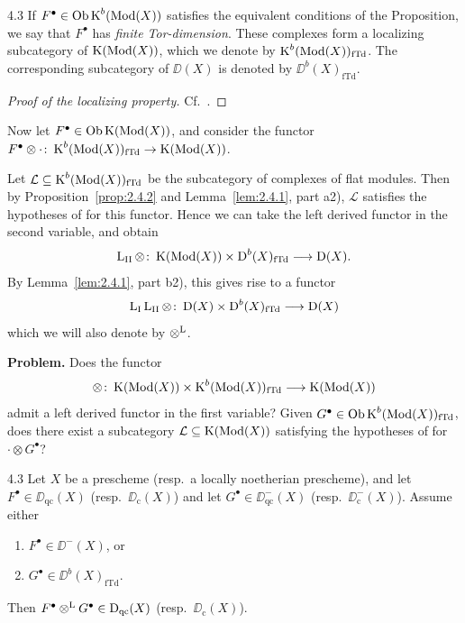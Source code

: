 \begin{bookdefinitioncorollary}{4.3}\label{defcor:2.4.3}
If $F^\bullet\in\operatorname{Ob}\operatorname{K}^b(\operatorname{Mod}(X))$ satisfies the equivalent conditions of the Proposition, we say that $F^\bullet$ has \emph{finite Tor-dimension}. These complexes form a localizing subcategory of $\operatorname{K}(\operatorname{Mod}(X))$, which we denote by $\operatorname{K}^b(\operatorname{Mod}(X))_{\mathrm{fTd}}$. The corresponding subcategory of $\DD(X)$ is denoted by $\DD^b(X)_{\mathrm{fTd}}$.
\end{bookdefinitioncorollary}

\begin{proof}[Proof of the localizing property]
Cf.\ .
\end{proof}

Now let $F^\bullet\in\operatorname{Ob}\operatorname{K}(\operatorname{Mod}(X))$, and consider the functor $F^\bullet\otimes\cdot\colon \operatorname{K}^b(\operatorname{Mod}(X))_{\mathrm{fTd}}\to\operatorname{K}(\operatorname{Mod}(X))$.

Let $\mathcal{L}\subseteq\operatorname{K}^b(\operatorname{Mod}(X))_{\mathrm{fTd}}$ be the subcategory of complexes of flat modules. Then by Proposition~\ref{prop:2.4.2} and Lemma~\ref{lem:2.4.1}, part a2), $\mathcal{L}$ satisfies the hypotheses of  for this functor. Hence we can take the left derived functor in the second variable, and obtain
\[
\operatorname{L}_{\mathrm{II}}\otimes\colon \operatorname{K}(\operatorname{Mod}(X)) \times \operatorname{D}^b(X)_{\mathrm{fTd}} \longrightarrow \operatorname{D}(X).
\]
By Lemma~\ref{lem:2.4.1}, part b2), this gives rise to a functor
\[
\operatorname{L}_{\mathrm{I}}\operatorname{L}_{\mathrm{II}}\otimes\colon \operatorname{D}(X) \times \operatorname{D}^b(X)_{\mathrm{fTd}} \longrightarrow \operatorname{D}(X)
\]
which we will also denote by $\mathbin{\otimes^{\mathrm{L}}}$.

\medskip

\textbf{Problem.}
Does the functor
\[
\otimes\colon \operatorname{K}(\operatorname{Mod}(X)) \times \operatorname{K}^b(\operatorname{Mod}(X))_{\mathrm{fTd}} \longrightarrow \operatorname{K}(\operatorname{Mod}(X))
\]
admit a left derived functor in the first variable? Given $G^\bullet\in\operatorname{Ob}\operatorname{K}^b(\operatorname{Mod}(X))_{\mathrm{fTd}}$, does there exist a subcategory $\mathcal{L}\subseteq\operatorname{K}(\operatorname{Mod}(X))$ satisfying the hypotheses of  for $\cdot\otimes G^\bullet$?

\begin{bookproposition}{4.3}\label{prop:2.4.4}
Let $X$ be a prescheme (resp.\ a locally noetherian prescheme), and let $F^\bullet\in\DD_{\mathrm{qc}}(X)$ (resp.\ $\DD_{\mathrm{c}}(X)$) and let $G^\bullet\in\DD_{\mathrm{qc}}^-(X)$ (resp.\ $\DD_{\mathrm{c}}^-(X)$). Assume either
\begin{enumerate}
\item[a)] $F^\bullet\in\DD^-(X)$, or
\item[b)] $G^\bullet\in\DD^b(X)_{\mathrm{fTd}}$.
\end{enumerate}
Then $F^\bullet\mathbin{\otimes^{\mathrm{L}}} G^\bullet\in\operatorname{D}_{\mathrm{qc}}(X)$ (resp.\ $\DD_{\mathrm{c}}(X)$).
\end{bookproposition}

